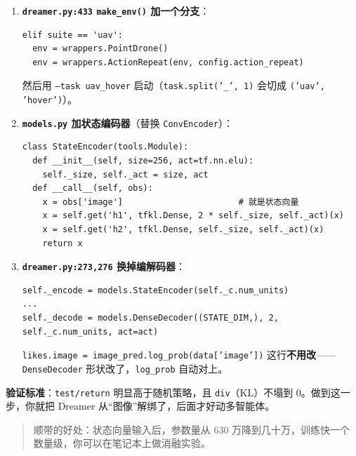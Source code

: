\documentclass[11pt]{ctexart}
\begin{document}
\begin{enumerate}
\begin{Verbatim}[frame=single,fontsize=\small]
# 改成：按你自己的观测统计量做标准化（或干脆只转 dtype）
obs['image'] = tf.cast(obs['image'], dtype)
\end{Verbatim}
  更稳的做法是固定一组 \texttt{mean/std} 常数（在 prefill 的 5000 步数据上统计一次），训练全程复用。
  \item \textbf{\texttt{dreamer.py:433} \texttt{make\_env()} 加一个分支}：
\begin{Verbatim}[frame=single,fontsize=\small]
elif suite == 'uav':
  env = wrappers.PointDrone()
  env = wrappers.ActionRepeat(env, config.action_repeat)
\end{Verbatim}
  然后用 \texttt{--task uav\_hover} 启动（\texttt{task.split('\_', 1)} 会切成 \texttt{('uav', 'hover')}）。
  \item \textbf{\texttt{models.py} 加状态编码器}（替换 \texttt{ConvEncoder}）：
\begin{Verbatim}[frame=single,fontsize=\small]
class StateEncoder(tools.Module):
  def __init__(self, size=256, act=tf.nn.elu):
    self._size, self._act = size, act
  def __call__(self, obs):
    x = obs['image']                       # 就是状态向量
    x = self.get('h1', tfkl.Dense, 2 * self._size, self._act)(x)
    x = self.get('h2', tfkl.Dense, self._size, self._act)(x)
    return x
\end{Verbatim}
  \item \textbf{\texttt{dreamer.py:273,276} 换掉编解码器}：
\begin{Verbatim}[frame=single,fontsize=\small]
self._encode = models.StateEncoder(self._c.num_units)
...
self._decode = models.DenseDecoder((STATE_DIM,), 2, self._c.num_units, act=act)
\end{Verbatim}
  \texttt{likes.image = image\_pred.log\_prob(data['image'])} 这行\textbf{不用改}——\texttt{DenseDecoder} 形状改了，\texttt{log\_prob} 自动对上。
\end{enumerate}

\textbf{验证标准}：\texttt{test/return} 明显高于随机策略，且 \texttt{div}（KL）不塌到 0。做到这一步，你就把 Dreamer 从``图像''解绑了，后面才好动多智能体。

\begin{quote}
顺带的好处：状态向量输入后，参数量从 630 万降到几十万，训练快一个数量级，你可以在笔记本上做消融实验。
\end{quote}
\end{document}

